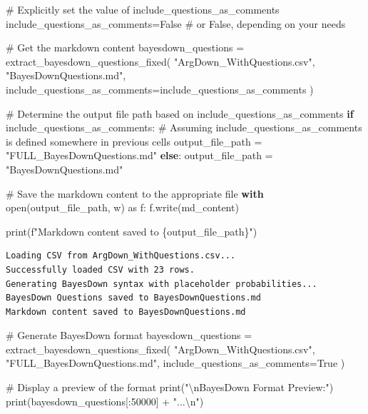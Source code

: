 \documentclass[
  11pt,
  letterpaper,
]{book}
\newenvironment{Shaded}{\begin{snugshade}}{\end{snugshade}}
\newcommand{\BuiltInTok}[1]{\textcolor[rgb]{0.00,0.23,0.31}{#1}}
\newcommand{\CharTok}[1]{\textcolor[rgb]{0.13,0.47,0.30}{#1}}
\newcommand{\CommentTok}[1]{\textcolor[rgb]{0.37,0.37,0.37}{#1}}
\newcommand{\ControlFlowTok}[1]{\textcolor[rgb]{0.00,0.23,0.31}{\textbf{#1}}}
\newcommand{\DecValTok}[1]{\textcolor[rgb]{0.68,0.00,0.00}{#1}}
\newcommand{\ImportTok}[1]{\textcolor[rgb]{0.00,0.46,0.62}{#1}}
\newcommand{\NormalTok}[1]{\textcolor[rgb]{0.00,0.23,0.31}{#1}}
\newcommand{\OperatorTok}[1]{\textcolor[rgb]{0.37,0.37,0.37}{#1}}
\newcommand{\SpecialCharTok}[1]{\textcolor[rgb]{0.37,0.37,0.37}{#1}}
\newcommand{\SpecialStringTok}[1]{\textcolor[rgb]{0.13,0.47,0.30}{#1}}
\newcommand{\StringTok}[1]{\textcolor[rgb]{0.13,0.47,0.30}{#1}}
\newcommand{\VariableTok}[1]{\textcolor[rgb]{0.07,0.07,0.07}{#1}}
\begin{document}
\begin{Shaded}
\begin{Highlighting}[]
\CommentTok{\# Explicitly set the value of include\_questions\_as\_comments}
\NormalTok{include\_questions\_as\_comments}\OperatorTok{=}\VariableTok{False}  \CommentTok{\# or False, depending on your needs}

\CommentTok{\# Get the markdown content}
\NormalTok{bayesdown\_questions }\OperatorTok{=}\NormalTok{ extract\_bayesdown\_questions\_fixed(}
  \StringTok{"ArgDown\_WithQuestions.csv"}\NormalTok{,}
  \StringTok{"BayesDownQuestions.md"}\NormalTok{, include\_questions\_as\_comments}\OperatorTok{=}\NormalTok{include\_questions\_as\_comments}
\NormalTok{)}

\CommentTok{\# Determine the output file path based on include\_questions\_as\_comments}
\ControlFlowTok{if}\NormalTok{ include\_questions\_as\_comments: }\CommentTok{\# Assuming include\_questions\_as\_comments is defined somewhere in previous cells}
\NormalTok{    output\_file\_path }\OperatorTok{=} \StringTok{"FULL\_BayesDownQuestions.md"}
\ControlFlowTok{else}\NormalTok{:}
\NormalTok{    output\_file\_path }\OperatorTok{=} \StringTok{"BayesDownQuestions.md"}

\CommentTok{\# Save the markdown content to the appropriate file}
\ControlFlowTok{with} \BuiltInTok{open}\NormalTok{(output\_file\_path, }\StringTok{\textquotesingle{}w\textquotesingle{}}\NormalTok{) }\ImportTok{as}\NormalTok{ f:}
\NormalTok{    f.write(md\_content)}

\BuiltInTok{print}\NormalTok{(}\SpecialStringTok{f"Markdown content saved to }\SpecialCharTok{\{}\NormalTok{output\_file\_path}\SpecialCharTok{\}}\SpecialStringTok{"}\NormalTok{)}
\end{Highlighting}
\end{Shaded}

\begin{verbatim}
Loading CSV from ArgDown_WithQuestions.csv...
Successfully loaded CSV with 23 rows.
Generating BayesDown syntax with placeholder probabilities...
BayesDown Questions saved to BayesDownQuestions.md
Markdown content saved to BayesDownQuestions.md
\end{verbatim}

\begin{Shaded}
\begin{Highlighting}[]
\CommentTok{\# Generate BayesDown format}
\NormalTok{bayesdown\_questions }\OperatorTok{=}\NormalTok{ extract\_bayesdown\_questions\_fixed(}
    \StringTok{"ArgDown\_WithQuestions.csv"}\NormalTok{,}
    \StringTok{"FULL\_BayesDownQuestions.md"}\NormalTok{,}
\NormalTok{    include\_questions\_as\_comments}\OperatorTok{=}\VariableTok{True}
\NormalTok{)}

\CommentTok{\# Display a preview of the format}
\BuiltInTok{print}\NormalTok{(}\StringTok{"}\CharTok{\textbackslash{}n}\StringTok{BayesDown Format Preview:"}\NormalTok{)}
\BuiltInTok{print}\NormalTok{(bayesdown\_questions[:}\DecValTok{50000}\NormalTok{] }\OperatorTok{+} \StringTok{"...}\CharTok{\textbackslash{}n}\StringTok{"}\NormalTok{)}
\end{Highlighting}
\end{Shaded}
\end{document}
